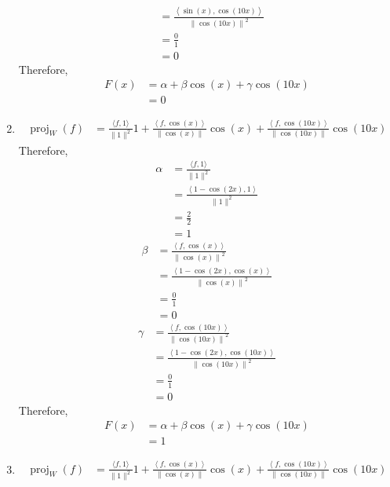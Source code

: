 \documentclass[fleqn, a4paper, 11pt, oneside]{amsart}
\theoremstyle{definition}
\theoremstyle{theorem}
\DeclareMathOperator{\proj}{proj}
\begin{document}
\begin{solution}
\begin{enumerate}
\begin{align*}
				&= \frac{\left\langle \sin(x),\cos(10 x) \right\rangle}{\left\| \cos(10 x) \right\|^2}\\
				&= \frac{0}{1}\\
				&= 0
			\end{align*}
			Therefore,
			\begin{align*}
				F(x) &= \alpha + \beta \cos(x) + \gamma \cos(10 x)\\
				&= 0
			\end{align*}
		\item
			\begin{align*}
				\proj_{W}(f) &= \frac{\langle f,1 \rangle}{\|1\|^2} 1 + \frac{\left\langle f,\cos(x) \right\rangle}{\left\| \cos(x) \right\|} \cos(x) + \frac{\left\langle f,\cos(10 x) \right\rangle}{\left\| \cos(10 x) \right\|} \cos(10 x)
			\end{align*}
			Therefore,
			\begin{align*}
				\alpha &= \frac{\langle f,1 \rangle}{\|1\|^2}\\
				&= \frac{\left\langle 1 - \cos(2 x),1 \right\rangle}{\|1\|^2}\\
				&= \frac{2}{2}\\
				&= 1
			\end{align*}
			\begin{align*}
				\beta &= \frac{\left\langle f,\cos(x) \right\rangle}{\left\| \cos(x) \right\|^2}\\
				&= \frac{\left\langle 1 - \cos(2 x),\cos(x) \right\rangle}{\left\| \cos(x) \right\|^2}\\
				&= \frac{0}{1}\\
				&= 0
			\end{align*}
			\begin{align*}
				\gamma &= \frac{\left\langle f,\cos(10 x) \right\rangle}{\left\| \cos(10 x) \right\|^2}\\
				&= \frac{\left\langle 1 - \cos(2 x),\cos(10 x) \right\rangle}{\left\| \cos(10 x) \right\|^2}\\
				&= \frac{0}{1}\\
				&= 0
			\end{align*}
			Therefore,
			\begin{align*}
				F(x) &= \alpha + \beta \cos(x) + \gamma \cos(10 x)\\
				&= 1
			\end{align*}
		\item
			\begin{align*}
				\proj_{W}(f) &= \frac{\langle f,1 \rangle}{\|1\|^2} 1 + \frac{\left\langle f,\cos(x) \right\rangle}{\left\| \cos(x) \right\|} \cos(x) + \frac{\left\langle f,\cos(10 x) \right\rangle}{\left\| \cos(10 x) \right\|} \cos(10 x)

\end{align*}
\end{enumerate}
\end{solution}
\end{document}
